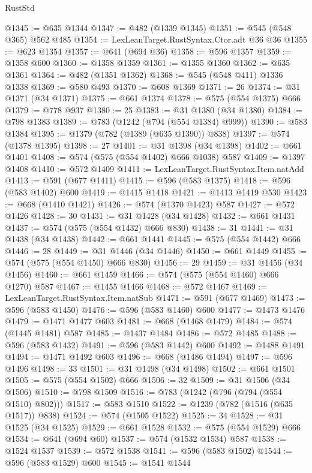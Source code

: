 \begin{lexlean}{RustStd}
\begin{coremodule}
{\begin{coremodule}
{{{{{{{{{{{{{{{{@1345 := @635 @1344
@1347 := @482 (@1339 @1345)
@1351 := @545 (@548 @365) @562 @485
@1354 := LexLeanTarget.RustSyntax.Ctor.adt @36 @36
@1355 := @623 @1354
@1357 := @641 (@694 @36)
@1358 := @596 @1357
@1359 := @1358 @600
@1360 := @1358 @1359
@1361 := @1355 @1360
@1362 := @635 @1361
@1364 := @482 (@1351 @1362)
@1368 := @545 (@548 @411) @1336 @1338
@1369 := @580 @493
@1370 := @608 @1369
@1371 := 26
@1374 := @31 @1371 (@34 @1371)
@1375 := @661 @1374
@1378 := @575 (@554 @1375) @666
@1379 := @778 @937
@1380 := 25
@1383 := @31 @1380 (@34 @1380)
@1384 := @798 @1383
@1389 := @783 (@1242 (@794 (@554 @1384) @999))
@1390 := @583 @1384
@1395 := @1379 (@782 (@1389 (@635 @1390)) @838)
@1397 := @574 (@1378 @1395)
@1398 := 27
@1401 := @31 @1398 (@34 @1398)
@1402 := @661 @1401
@1408 := @574 (@575 (@554 @1402) @666 @1038) @587
@1409 := @1397 @1408
@1410 := @572 @1409
@1411 := LexLeanTarget.RustSyntax.Item.natAdd
@1413 := @591 (@677 @1411)
@1415 := @596 (@583 @1375)
@1418 := @596 (@583 @1402) @600
@1419 := @1415 @1418
@1421 := @1413 @1419 @530
@1423 := @668 (@1410 @1421)
@1426 := @574 (@1370 @1423) @587
@1427 := @572 @1426
@1428 := 30
@1431 := @31 @1428 (@34 @1428)
@1432 := @661 @1431
@1437 := @574 (@575 (@554 @1432) @666 @830)
@1438 := 31
@1441 := @31 @1438 (@34 @1438)
@1442 := @661 @1441
@1445 := @575 (@554 @1442) @666
@1446 := 28
@1449 := @31 @1446 (@34 @1446)
@1450 := @661 @1449
@1455 := @574 (@575 (@554 @1450) @666 @830)
@1456 := 29
@1459 := @31 @1456 (@34 @1456)
@1460 := @661 @1459
@1466 := @574 (@575 (@554 @1460) @666 @1270) @587
@1467 := @1455 @1466
@1468 := @572 @1467
@1469 := LexLeanTarget.RustSyntax.Item.natSub
@1471 := @591 (@677 @1469)
@1473 := @596 (@583 @1450)
@1476 := @596 (@583 @1460) @600
@1477 := @1473 @1476
@1479 := @1471 @1477 @603
@1481 := @668 (@1468 @1479)
@1484 := @574 (@1445 @1481) @587
@1485 := @1437 @1484
@1486 := @572 @1485
@1488 := @596 (@583 @1432)
@1491 := @596 (@583 @1442) @600
@1492 := @1488 @1491
@1494 := @1471 @1492 @603
@1496 := @668 (@1486 @1494)
@1497 := @596 @1496
@1498 := 33
@1501 := @31 @1498 (@34 @1498)
@1502 := @661 @1501
@1505 := @575 (@554 @1502) @666
@1506 := 32
@1509 := @31 @1506 (@34 @1506)
@1510 := @798 @1509
@1516 := @783 (@1242 (@796 (@794 (@554 @1510) @802)))
@1517 := @583 @1510
@1522 := @1239 (@782 (@1516 (@635 @1517)) @838)
@1524 := @574 (@1505 @1522)
@1525 := 34
@1528 := @31 @1525 (@34 @1525)
@1529 := @661 @1528
@1532 := @575 (@554 @1529) @666
@1534 := @641 (@694 @60)
@1537 := @574 (@1532 @1534) @587
@1538 := @1524 @1537
@1539 := @572 @1538
@1541 := @596 (@583 @1502)
@1544 := @596 (@583 @1529) @600
@1545 := @1541 @1544
}}}}}}}}}}}}}}}}
\end{coremodule}}
\end{coremodule}
\end{lexlean}
